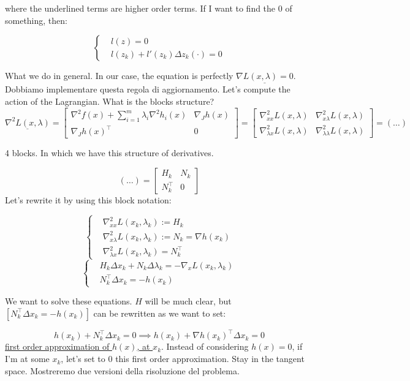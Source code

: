 where the underlined terms are higher order terms.
If I want to find the 0 of something, then:

\[
	\left\{
	\begin{aligned}
	&l(z) = 0\\
	&l(z_k) + l'(z_k)\Delta z_k(\mathord{\cdot}) = 0
	\end{aligned}
	\right.
\]

What we do in general. In our case, the equation is perfectly $\underline{\nabla{L(x,\lambda)} = 0}$. Dobbiamo implementare questa regola di aggiornamento. Let's compute the action of the Lagrangian. What is the blocks structure?
\[
	\underline{\nabla^2{L(x,\lambda)}} = \begin{bmatrix}\nabla^2{f(x)} + \sum_{i=1}^m{\lambda_i\nabla^2{h_i(x)}}&\nabla_J{h(x)}\\ \nabla_J{h(x)}^\top&0\end{bmatrix} = \begin{bmatrix}\nabla^2_{xx}{L(x,\lambda)}&\nabla^2_{x\lambda}{L(x,\lambda)}\\ \nabla^2_{\lambda x}{L(x,\lambda)}&\nabla^2_{\lambda\lambda}{L(x,\lambda)}\end{bmatrix} = (\dots)
\]

4 blocks. In which we have this structure of derivatives. 

\[
	(\dots) = \begin{bmatrix}H_k&N_k\\N_k^\top&0\end{bmatrix}
\]
Let's rewrite it by using this block notation:

\[
	\left\{
	\begin{aligned}
	&\nabla^2_{xx}{L(x_k,\lambda_k)} := H_k\\
	&\nabla^2_{x\lambda}{L(x_k,\lambda_k)} := N_k = \nabla{h(x_k)}\\
	&\nabla^2_{\lambda x}{L(x_k,\lambda_k)} = N_k^\top
	\end{aligned}
	\right.
\]
\[
	\left\{
	\begin{aligned}
	&H_k\Delta x_k + N_k\Delta\lambda_k = -\nabla_x{L(x_k,\lambda_k)}\\
	&N_k^\top\Delta x_k = -h(x_k)
	\end{aligned}
	\right.
\]

We want to solve these equations. $H$ will be much clear, but $[N_k^\top\Delta x_k = -h(x_k)]$ can be rewritten as we want to set:

\[
	h(x_k) + N_k^\top\Delta x_k = 0\implies h(x_k) + \nabla{h(x_k)}^\top\Delta x_k = 0
\]
\underline{first order approximation of $h(x)$, at $x_k$}. 
Instead of considering $h(x)=0$, if I'm at some $x_k$, let's set to 0 this first order approximation. Stay in the tangent space. Mostreremo due versioni della risoluzione del problema.

